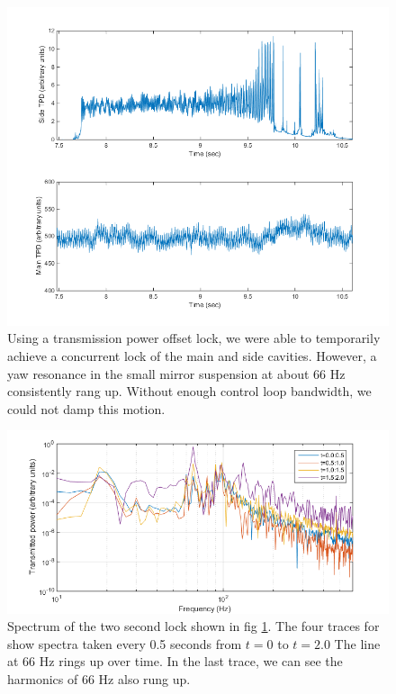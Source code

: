 \begin{figure}[htp]
\begin{center}
\includegraphics[width=\textwidth]{figures/Angular/sideLock.png}
\end{center}
\caption[Side Cavity lock attempt]{%
\label{f:sidelock}
Using a transmission power offset lock, we were able to temporarily achieve a concurrent lock of the main and side cavities. However, a yaw resonance in the small mirror suspension at about 66 Hz consistently rang up. Without enough control loop bandwidth, we could not damp this motion.}
\end{figure}

\begin{figure}[htp]
\begin{center}
\includegraphics[width=\textwidth]{figures/Angular/sideLockSpec.png}
\end{center}
\caption[Side Cavity lock spectrum]{%
\label{f:sidelockspec}
Spectrum of the two second lock shown in fig \ref{f:sidelock}. The four traces for show spectra taken every 0.5 seconds from $t=0$ to $t = 2.0$ The line at 66 Hz rings up over time. In the last trace, we can see the harmonics of 66 Hz also rung up.}
\end{figure}

